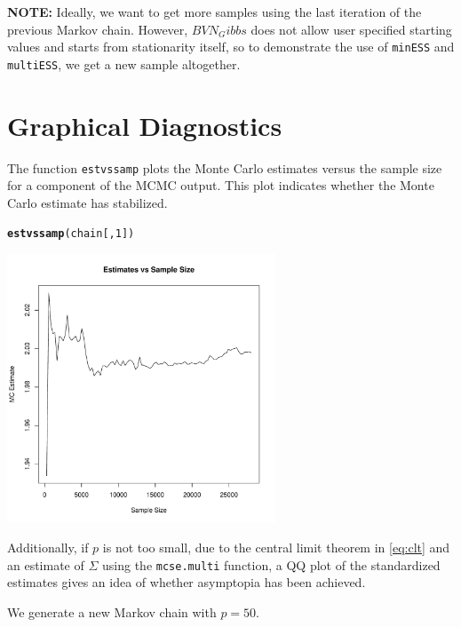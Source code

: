 \documentclass[11pt]{article}\usepackage[]{graphicx}\usepackage[]{color}
\makeatletter
\newcommand{\hlnum}[1]{\textcolor[rgb]{0.686,0.059,0.569}{#1}}%
\newcommand{\hlstd}[1]{\textcolor[rgb]{0.345,0.345,0.345}{#1}}%
\newcommand{\hlkwd}[1]{\textcolor[rgb]{0.737,0.353,0.396}{\textbf{#1}}}%
\newenvironment{kframe}{%
 \def\at@end@of@kframe{}%
 \ifinner\ifhmode%
  \def\at@end@of@kframe{\end{minipage}}%
  \begin{minipage}{\columnwidth}%
 \fi\fi%
 \def\FrameCommand##1{\hskip\@totalleftmargin \hskip-\fboxsep
 \colorbox{shadecolor}{##1}\hskip-\fboxsep
     \hskip-\linewidth \hskip-\@totalleftmargin \hskip\columnwidth}%
 \MakeFramed {\advance\hsize-\width
   \@totalleftmargin\z@ \linewidth\hsize
   \@setminipage}}%
 {\par\unskip\endMakeFramed%
 \at@end@of@kframe}
\newenvironment{knitrout}{}{} %
\makeatother
\begin{document}
\textbf{NOTE:} Ideally, we want to get more samples using the last iteration of the previous Markov chain. However, $BVN_Gibbs$ does not allow user specified starting values and starts from stationarity itself, so to demonstrate the use of \texttt{minESS} and \texttt{multiESS}, we get a new sample altogether. 

\section{Graphical Diagnostics}

The function \texttt{estvssamp} plots the Monte Carlo estimates versus the sample size for a component of the MCMC output. This plot indicates whether the Monte Carlo estimate has stabilized.

\begin{knitrout}
\color{fgcolor}\begin{kframe}
\begin{alltt}
\hlkwd{estvssamp}\hlstd{(chain[,}\hlnum{1}\hlstd{])}
\end{alltt}
\end{kframe}
\includegraphics[width=8cm]{figure/estvssamp-1} 

\end{knitrout}

Additionally, if $p$ is not too small, due to the central limit theorem in \eqref{eq:clt} and an estimate of $\Sigma$ using the \texttt{mcse.multi} function, a QQ plot of the standardized estimates gives an idea of whether asymptopia has been achieved.

We generate a new Markov chain with $p = 50$.
\end{document}
